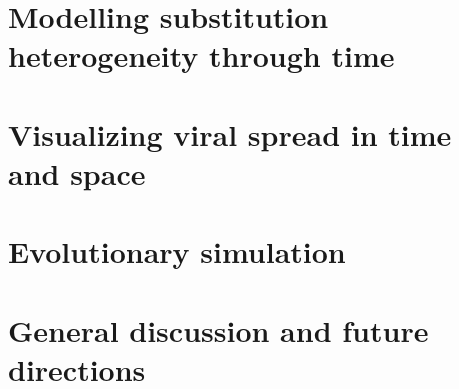 \documentclass[12pt,twoside]{mitthesis}
\theoremstyle{plain}
\theoremstyle{definition}
\theoremstyle{remark}
\begin{document}


\chapter{Modelling substitution heterogeneity through time}


\chapter{Visualizing viral spread in time and space}


\chapter{Evolutionary simulation}




\chapter{General discussion and future directions}



\end{document}
